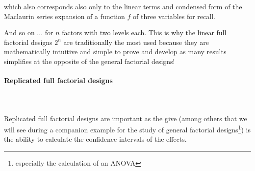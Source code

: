	which also corresponds also only to the linear terms and condensed form of the Maclaurin series expansion of a function $f$ of three variables for recall.

	And so on ... for $n$ factors with two levels each. This is why the linear full factorial designs $2^n$ are traditionally the most used because they are mathematically intuitive and simple to prove and develop as many results simplifies at the opposite of the general factorial designs!

	\pagebreak
	\paragraph{Replicated full factorial designs}\mbox{}\\\\
	Replicated full factorial designs are important as the give (among others that we will see during a companion example for the study of general factorial designs\footnote{especially the calculation of an ANOVA}) is the ability to calculate the confidence intervals of the effects.
	
